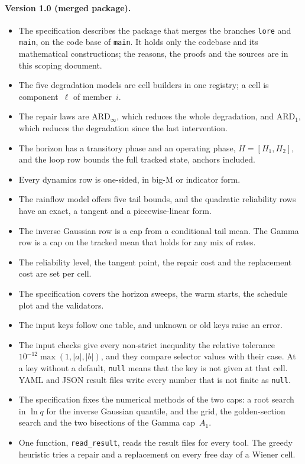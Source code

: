 \documentclass[11pt,a4paper]{article}
\theoremstyle{plain}
\theoremstyle{definition}
\theoremstyle{remark}
\begin{document}
\paragraph{Version 1.0 (merged package).}
\begin{itemize}
  \item The specification describes the package that merges the branches \texttt{lore} and \texttt{main}, on the code base of \texttt{main}.
    It holds only the codebase and its mathematical constructions; the reasons, the proofs and the sources are in this scoping document.
  \item The five degradation models are cell builders in one registry; a cell is component~$\ell$ of member~$i$.
  \item The repair laws are $\text{ARD}_\infty$, which reduces the whole degradation, and $\text{ARD}_1$, which reduces the degradation since the last intervention.
  \item The horizon has a transitory phase and an operating phase, $H = [H_1, H_2]$, and the loop row bounds the full tracked state, anchors included.
  \item Every dynamics row is one-sided, in big-M or indicator form.
  \item The rainflow model offers five tail bounds, and the quadratic reliability rows have an exact, a tangent and a piecewise-linear form.
  \item The inverse Gaussian row is a cap from a conditional tail mean.
    The Gamma row is a cap on the tracked mean that holds for any mix of rates.
  \item The reliability level, the tangent point, the repair cost and the replacement cost are set per cell.
  \item The specification covers the horizon sweeps, the warm starts, the schedule plot and the validators.
  \item The input keys follow one table, and unknown or old keys raise an error.
  \item The input checks give every non-strict inequality the relative tolerance $10^{-12}\max(1, |a|, |b|)$, and they compare selector values with their case.
    At a key without a default, \texttt{null} means that the key is not given at that cell.
    YAML and JSON result files write every number that is not finite as \texttt{null}.
  \item The specification fixes the numerical methods of the two caps: a root search in $\ln q$ for the inverse Gaussian quantile, and the grid, the golden-section search and the two bisections of the Gamma cap~$A_1$.
  \item One function, \texttt{read\_result}, reads the result files for every tool.
    The greedy heuristic tries a repair and a replacement on every free day of a Wiener cell.
\end{itemize}
\end{document}
